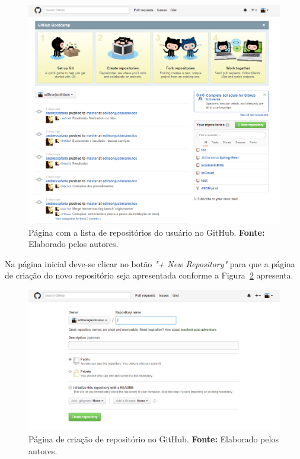 \newpage
\captionsetup[figure]{list=no}
\begin{figure}[h!]
	\centerline{\includegraphics[scale=0.5]{./imagens/apendices/pagina-home-github.png}}
	\caption[Página com a lista de repositórios do usuário no GitHub.]
	{Página com a lista de repositórios do usuário no GitHub. \textbf{Fonte:} Elaborado pelos autores.}
	\label{fig:ap3:pagina_home_github}
\end{figure}


Na página inicial deve-se clicar no botão \textit{"+ New Repository"} para que a página de criação do novo repositório seja apresentada conforme a Figura~\ref{fig:ap3:pagina_criacao_repository_github} apresenta.
\newpage
\captionsetup[figure]{list=no}
\begin{figure}[h!]
	\centerline{\includegraphics[scale=0.5]{./imagens/apendices/pagina-criacao-repositorio-github.png}}
	\caption[Página de criação de repositório no GitHub.]
	{Página de criação de repositório no GitHub. \textbf{Fonte:} Elaborado pelos autores.}
	\label{fig:ap3:pagina_criacao_repository_github}
\end{figure}

